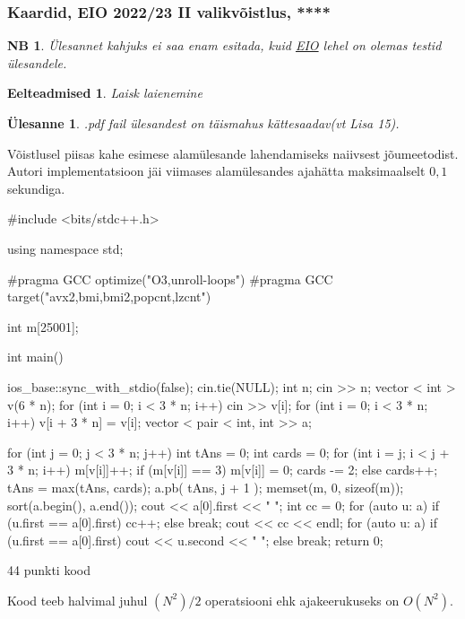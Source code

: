 \documentclass{trkut}
\newtheorem*{prereq}{Eelteadmised}
\newtheorem*{extra}{NB}
\newtheorem*{Text}{Ülesanne}
\begin{document}
\subsubsection{Kaardid, EIO 2022/23 II valikvõistlus, ****}
\begin{extra}
Ülesannet kahjuks ei saa enam esitada, kuid \href{eio.ee}{EIO} lehel on olemas testid ülesandele.
\end{extra}
\begin{prereq}
Laisk laienemine
\end{prereq}
\begin{Text}
.pdf fail ülesandest on täismahus kättesaadav(vt Lisa 15). \parencite{10}
\end{Text}

Võistlusel piisas kahe esimese alamülesande lahendamiseks naiivsest jõumeetodist.
Autori implementatsioon jäi viimases alamülesandes ajahätta maksimaalselt $0,1$ sekundiga.
 \begin{cclol}
#include <bits/stdc++.h>

using namespace std;

#pragma GCC optimize("O3,unroll-loops")
#pragma GCC target("avx2,bmi,bmi2,popcnt,lzcnt")

int m[25001];

int main() {
  ios_base::sync_with_stdio(false);
  cin.tie(NULL);
  int n;
  cin >> n;
  vector < int > v(6 * n);
  for (int i = 0; i < 3 * n; i++) {
    cin >> v[i];
  }
  for (int i = 0; i < 3 * n; i++) {
    v[i + 3 * n] = v[i];
  }
  vector < pair < int, int >> a;

  for (int j = 0; j < 3 * n; j++) {
    int tAns = 0;
    int cards = 0;
    for (int i = j; i < j + 3 * n; i++) {
      m[v[i]]++;
      if (m[v[i]] == 3) {
        m[v[i]] = 0;
        cards -= 2;
      } else {
        cards++;
      }
      tAns = max(tAns, cards);
    }
    a.pb({
      tAns,
      j + 1
    });
    memset(m, 0, sizeof(m));
  }
  sort(a.begin(), a.end());
  cout << a[0].first << " ";
  int cc = 0;
  for (auto u: a) {
    if (u.first == a[0].first) cc++;
    else break;
  }
  cout << cc << endl;
  for (auto u: a) {
    if (u.first == a[0].first) cout << u.second << " ";
    else break;
  }
  return 0;
}
    \end{cclol}
    \begin{kk}[H]
    \caption{44 punkti kood}%
    \end{kk}

Kood teeb halvimal juhul $(N^2)/2$ operatsiooni ehk ajakeerukuseks on $O(N^2)$.
\end{document}
